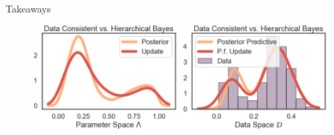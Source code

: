 

\vspace{-1.cm}


\begin{block}{Takeaways}

\centering
\vspace{-0.5cm}
\begin{figure}
        \includegraphics[width=30cm]{figures/distr_EX_comparison.png}
        \vspace{-0.5cm} 
        \caption{ }
    \end{figure}
\end{block}
